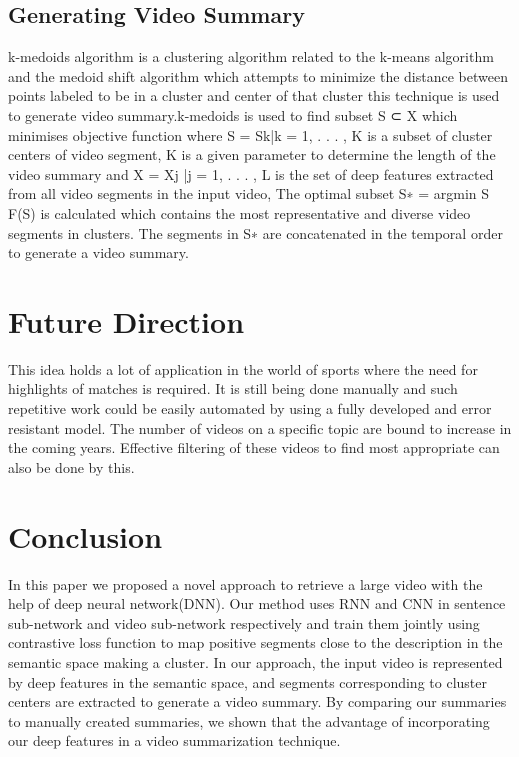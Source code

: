 \documentclass[twocolumn,showpacs,%
  nofootinbib,aps,superscriptaddress,%
  eqsecnum,prd,notitlepage,showkeys,10pt]{revtex4-1}
\begin{document}
\subsection{Generating Video Summary}

k-medoids algorithm is a clustering algorithm related to the k-means algorithm and the medoid shift algorithm which attempts to minimize the distance between points labeled to be in a cluster and center of that cluster this technique is used to generate video summary.k-medoids is used to find subset S ⊂ X which minimises objective function where S = {Sk|k = 1, . . . , K}  is a subset of cluster centers of video segment, K is a given parameter to determine the length of the video summary and X = {Xj |j = 1, . . . , L} is the set of deep features extracted from all video segments in the input video, 
The optimal subset S∗ = argmin S F(S) is calculated which contains the most representative and diverse video segments in clusters. The segments in S∗ are concatenated in the temporal order to generate a video summary.

\section{Future Direction}
This idea holds a lot of application in the world of sports where the need for highlights of matches is required. It is still being done manually and such repetitive work could be easily automated by using a fully developed and error resistant model. The number of videos on a specific topic are bound to increase in the coming years. Effective filtering of these videos to find most appropriate can also be done by this.

\section{Conclusion}

In this paper we proposed a novel approach to retrieve a large video with the help of deep neural network(DNN).  Our method uses RNN and CNN in sentence sub-network and video sub-network respectively and train them jointly using contrastive loss function to map positive segments close to the description in the semantic space making a cluster. In our approach, the input video is represented by deep features in the semantic space, and segments corresponding to cluster centers are extracted to generate a video summary. By comparing our summaries to manually created summaries, we shown that the advantage of incorporating our deep features in a video summarization technique.
\end{document}
